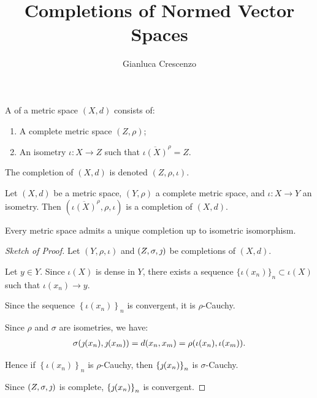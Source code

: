 \documentclass[10pt]{beamer}
\title[Completions of Normed Vector Spaces]{Completions of Normed Vector Spaces}
\author[Gianluca Crescenzo]{Gianluca Crescenzo}
\theoremstyle{plain} %
\theoremstyle{remark} %
\begin{document}
\begin{frame}
  \titlepage
\end{frame}

\begin{frame}
    \begin{definition}
        A  of a metric space $(X,d)$ consists of:
            \begin{enumerate}[label = (\arabic*),itemsep=1pt,topsep=3pt]
                \item A complete metric space $(Z,\rho)$;
                \item An isometry $\iota:X \rightarrow Z$ such that $\overline{\iota(X)}^\rho = Z$.
            \end{enumerate}
        The completion of $(X,d)$ is denoted $(Z,\rho,\iota)$.
    \end{definition}
    \pause
    \begin{lemma}
        Let $(X,d)$ be a metric space, $(Y,\rho)$ a complete metric space, and $\iota:X \rightarrow Y$ an isometry. Then $(\overline{\iota(X)}^\rho , \rho, \iota)$ is a completion of $(X,d)$.
    \end{lemma}
\end{frame}

\begin{frame}
    \begin{theorem}
        Every metric space admits a unique completion up to isometric isomorphism.
    \end{theorem}
    \pause
    \begin{proof}[Sketch of Proof]
        \noindent Let $(Y,\rho,\iota)$ and $(Z,\sigma,\jmath)$ be completions of $(X,d)$. \nl
        
        \noindent Let $y \in Y$. Since $\iota(X)$ is dense in $Y$, there exists a sequence $\{\iota(x_n)\}_n \subset \iota(X)$ such that $\iota(x_n) \rightarrow y$. \nl
        
        \noindent Since the sequence $\left\{ \iota(x_n) \right\}_n$ is convergent, it is $\rho$-Cauchy. \nl
        
        \noindent Since $\rho$ and $\sigma$ are isometries, we have:
            \begin{equation*}
            \begin{split}
                \sigma(\jmath(x_n),\jmath(x_m)) = d(x_n,x_m) = \rho(\iota(x_n),\iota(x_m)).
            \end{split}
            \end{equation*}
            
        \noindent Hence if $\left\{ \iota(x_n) \right\}_n$ is $\rho$-Cauchy, then $\left\{ \jmath(x_n) \right\}_n$ is $\sigma$-Cauchy. \nl
        
        \noindent Since $(Z,\sigma,\jmath)$ is complete, $\left\{ \jmath(x_n) \right\}_n$ is convergent.\phantom{\qedhere}
    \end{proof}
\end{frame}
\end{document}
